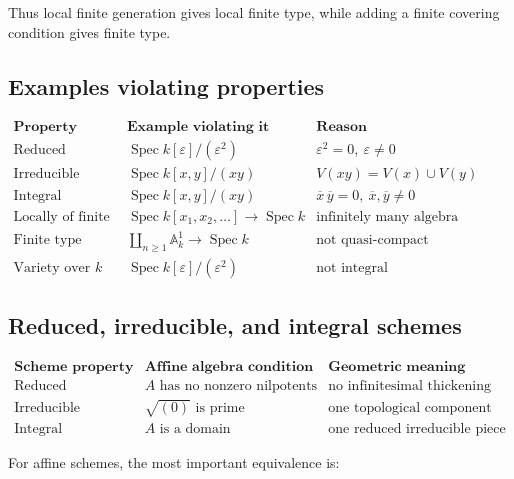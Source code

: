 \documentclass[12pt,a4paper]{article}
\theoremstyle{notespace}
\begin{document}
Thus local finite generation gives local finite type, while adding a finite covering condition gives finite type.

\subsection{Examples violating properties}

\[
\begin{array}{c|c|c}
	\textbf{Property}
	&
	\textbf{Example violating it}
	&
	\textbf{Reason}
	\\
	\hline
	\text{Reduced}
	&
	\operatorname{Spec}k[\varepsilon]/(\varepsilon^2)
	&
	\varepsilon^2=0,\ \varepsilon\neq 0
	\\[5pt]
	\text{Irreducible}
	&
	\operatorname{Spec}k[x,y]/(xy)
	&
	V(xy)=V(x)\cup V(y)
	\\[5pt]
	\text{Integral}
	&
	\operatorname{Spec}k[x,y]/(xy)
	&
	\overline{x}\,\overline{y}=0,\ 
	\overline{x},\overline{y}\neq 0
	\\[5pt]
	\text{Locally of finite type}
	&
	\operatorname{Spec}k[x_1,x_2,\dots]\to \operatorname{Spec}k
	&
	\text{infinitely many algebra generators}
	\\[5pt]
	\text{Finite type}
	&
	\displaystyle \coprod_{n\geq 1}\mathbb A_k^1\to \operatorname{Spec}k
	&
	\text{not quasi-compact}
	\\[8pt]
	\text{Variety over }k
	&
	\operatorname{Spec}k[\varepsilon]/(\varepsilon^2)
	&
	\text{not integral}
\end{array}
\]

\subsection{Reduced, irreducible, and integral schemes}

\[
\begin{array}{c|c|c}
	\textbf{Scheme property}
	&
	\textbf{Affine algebra condition}
	&
	\textbf{Geometric meaning}
	\\
	\hline
	\text{Reduced}
	&
	A\text{ has no nonzero nilpotents}
	&
	\text{no infinitesimal thickening}
	\\[5pt]
	\text{Irreducible}
	&
	\sqrt{(0)}\text{ is prime}
	&
	\text{one topological component}
	\\[5pt]
	\text{Integral}
	&
	A\text{ is a domain}
	&
	\text{one reduced irreducible piece}
\end{array}
\]

For affine schemes, the most important equivalence is:
\end{document}
